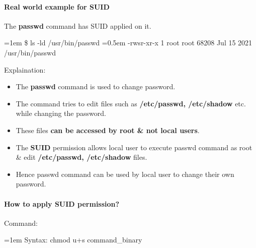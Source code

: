 \begin{flushleft}
	\paragraph{Real world example for SUID}
	The \textbf{passwd} command has SUID applied on it.
	\bigskip
	\begin{tcolorbox}[breakable,notitle,boxrule=-0pt,colback=black,colframe=black]
		\color{green}
		\font=1em
		\$ ls -ld /usr/bin/passwd
		\color{white}
		\newline
		\font=0.5em
		-rwsr-xr-x 1 root root 68208 Jul 15  2021 /usr/bin/passwd
		\font=4pt
	\end{tcolorbox}
	Explaination:
	\begin{itemize}
		\item The \textbf{passwd} command is used to change password.
		\item The command tries to edit files such as \textbf{/etc/passwd, /etc/shadow} etc. while changing the password.
		\item These files \textbf{can be accessed by root \& not local users}.
		\item The \textbf{SUID} permission allows local user to execute passwd command as root \& edit \textbf{/etc/passwd, /etc/shadow} files.
		\item Hence passwd command can be used by local user to change their own password.
	\end{itemize}
	
	\newpage
	
	\paragraph{How to apply SUID permission?}
	Command:
	\begin{tcolorbox}[breakable,notitle,boxrule=0pt,colback=pink,colframe=pink]
		\color{black}
		\font=1em
		Syntax: chmod u+s command\_binary
		\font=4pt
	\end{tcolorbox}
	

\end{flushleft}
